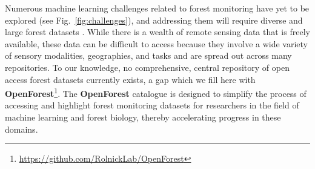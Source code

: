 \documentclass{CUP-JNL-DTM}%
\newcommand{\EL}[1]{\textcolor{orange}{#1}}
\theoremstyle{definition}
\numberwithin{equation}{section}
\begin{document}

Numerous machine learning challenges related to forest monitoring have yet to be explored (see Fig.~\ref{fig:challenges}), and addressing them will require diverse and large forest datasets \cite{liang_importance_2020}. %
While there is a wealth of remote sensing data that is freely available, these data can be difficult to access because they involve a wide variety of sensory modalities, geographies, and tasks and are spread out across many repositories. To our knowledge, no comprehensive, central repository of open access forest datasets currently exists, a gap which we fill here with \textbf{OpenForest}\footnote{\url{https://github.com/RolnickLab/OpenForest}}. The \textbf{OpenForest} catalogue is designed to simplify the process of accessing and highlight forest monitoring datasets for researchers in the field of machine learning and forest biology, thereby accelerating progress in these domains.
\end{document}

